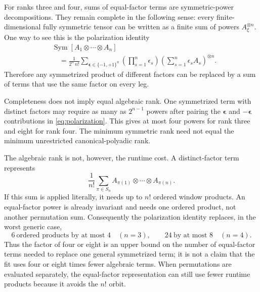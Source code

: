 \documentclass{article}
\begin{document}
For ranks three and four, sums of equal-factor terms are symmetric-power
decompositions. They remain complete in the following sense: every
finite-dimensional fully symmetric tensor can be written as a finite sum
of powers $A_\xi^{\otimes n}$. One way to see this is the polarization
identity
\begin{align}
    &\operatorname{Sym}
    [A_1\otimes\cdots\otimes A_n]
    \nonumber\\
    &\quad =
    \frac{1}{2^n\,n!}
    \sum_{\boldsymbol\epsilon\in\{-1,+1\}^n}
    \left(\prod_{s=1}^n\epsilon_s\right)
    \left(\sum_{s=1}^n\epsilon_s A_s\right)^{\otimes n}.
    \label{eq:polarization}
\end{align}
Therefore any symmetrized product of different factors can be replaced by
a sum of terms that use the same factor on every leg.

Completeness does not imply equal algebraic rank. One symmetrized
term with distinct factors may require as many as $2^{n-1}$ powers
after pairing the $\boldsymbol\epsilon$ and $-\boldsymbol\epsilon$
contributions in \autoref{eq:polarization}. This gives at most four powers
for rank three and eight for rank four. The minimum symmetric rank need not
equal the minimum unrestricted canonical-polyadic rank.

The algebraic rank is not, however, the runtime cost. A distinct-factor
term represents
\begin{equation}
    \frac{1}{n!}\sum_{\pi\in S_n}
    A_{\pi(1)}\otimes\cdots\otimes A_{\pi(n)}.
    \label{eq:explicit-permutation-orbit}
\end{equation}
If this sum is applied literally, it needs up to $n!$ ordered window
products. An equal-factor power is already invariant and needs one ordered
product, not another permutation sum. Consequently the polarization
identity replaces, in the worst generic case,
\begin{equation}
    6\ \text{ordered products by at most }4
    \quad(n=3),
    \qquad
    24\ \text{by at most }8
    \quad(n=4).
    \label{eq:polarization-runtime-bound}
\end{equation}
Thus the factor of four or eight is an upper bound on the number of
equal-factor terms needed to replace one general symmetrized term; it is not
a claim that the fit uses four or eight times fewer algebraic terms. When
permutations are evaluated separately, the equal-factor representation can
still use fewer runtime products because it avoids the $n!$ orbit.
\end{document}
